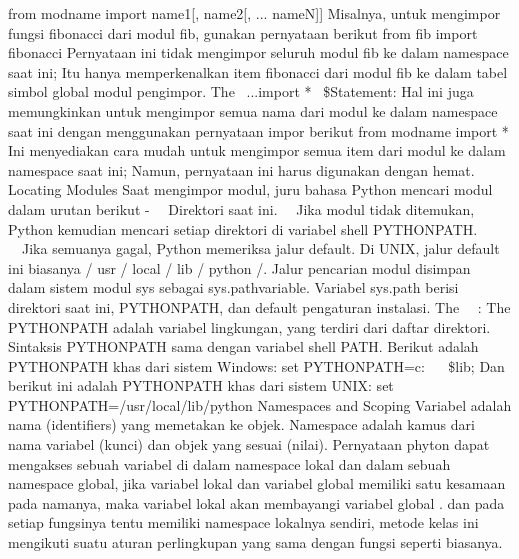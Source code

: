  \hspace*{0.5in} from modname import name1[, name2[, ... nameN]] 
Misalnya, untuk mengimpor fungsi fibonacci dari modul fib, gunakan pernyataan berikut 
 \hspace*{0.5in} from fib import fibonacci 
Pernyataan ini tidak mengimpor seluruh modul fib ke dalam namespace saat ini; Itu hanya memperkenalkan item fibonacci dari modul fib ke dalam tabel simbol global modul pengimpor.  
The \  \from...import * \  \$Statement: 
Hal ini juga memungkinkan untuk mengimpor semua nama dari modul ke dalam namespace saat ini dengan menggunakan pernyataan impor berikut 
 \hspace*{0.5in} from modname import * 
Ini menyediakan cara mudah untuk mengimpor semua item dari modul ke dalam namespace saat ini; Namun, pernyataan ini harus digunakan dengan hemat.
Locating Modules
Saat mengimpor modul, juru bahasa Python mencari modul dalam urutan berikut - 
 \hspace*{0.5in}  \ \bullet \ Direktori saat ini. 
 \hspace*{0.5in}  \ \bullet \ Jika modul tidak ditemukan, Python kemudian mencari setiap direktori di variabel shell  \hspace*{0.5in} PYTHONPATH. 
 \hspace*{0.5in}  \ \bullet \ Jika semuanya gagal, Python memeriksa jalur default. Di UNIX, jalur default ini  \hspace*{0.5in} biasanya / usr / local / lib / python /. 
Jalur pencarian modul disimpan dalam sistem modul sys sebagai sys.pathvariable. Variabel sys.path berisi direktori saat ini, PYTHONPATH, dan default pengaturan instalasi.
The \  \PYTHONPATH \  \Variable:  
The PYTHONPATH adalah variabel lingkungan, yang terdiri dari daftar direktori. Sintaksis PYTHONPATH sama dengan variabel shell PATH. 
Berikut adalah PYTHONPATH khas dari sistem Windows: 
 \hspace*{0.5in} set PYTHONPATH=c: \  \setminus  {} \  \setminus  \$lib;  
Dan berikut ini adalah PYTHONPATH khas dari sistem UNIX: 
 \hspace*{0.5in} set PYTHONPATH=/usr/local/lib/python  
Namespaces and Scoping  
Variabel adalah nama (identifiers) yang memetakan ke objek. Namespace adalah kamus dari nama variabel (kunci) dan objek yang sesuai (nilai).  
Pernyataan phyton dapat mengakses sebuah variabel di dalam namespace lokal dan dalam sebuah namespace global, jika variabel lokal dan variabel global memiliki satu kesamaan pada namanya, maka variabel lokal akan membayangi variabel global . dan pada setiap fungsinya tentu memiliki namespace lokalnya sendiri, metode kelas ini mengikuti suatu aturan perlingkupan yang sama dengan fungsi seperti biasanya.  

